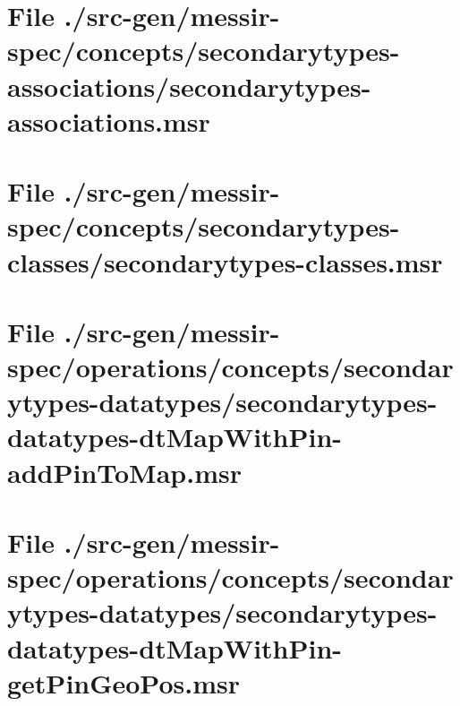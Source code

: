 \section[File /src-gen/messir-spec/concepts.../secondarytypes-associations.msr]{File ./src-gen/messir-spec/concepts/secondarytypes-associations/secondarytypes-associations.msr}
\scriptsize

\normalsize
	
\section[File /src-gen/messir-spec/concepts.../secondarytypes-classes.msr]{File ./src-gen/messir-spec/concepts/secondarytypes-classes/secondarytypes-classes.msr}
\scriptsize

\normalsize
	
\section[File /src-gen.../secondarytypes-datatypes-dtMapWithPin-addPinToMap.msr]{File ./src-gen/messir-spec/operations/concepts/secondarytypes-datatypes/secondarytypes-datatypes-dtMapWithPin-addPinToMap.msr}
\scriptsize

\normalsize
	
\section[File /src-gen.../secondarytypes-datatypes-dtMapWithPin-getPinGeoPos.msr]{File ./src-gen/messir-spec/operations/concepts/secondarytypes-datatypes/secondarytypes-datatypes-dtMapWithPin-getPinGeoPos.msr}
\scriptsize

\normalsize
	
